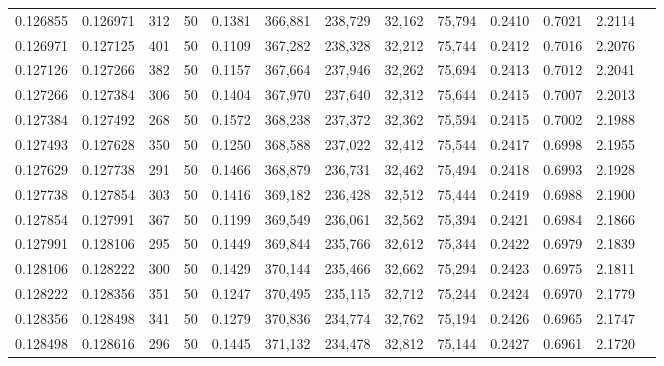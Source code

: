 \begin{tabular}{rrrrrrrrrrrrr}
0.126855 & 0.126971 &   312 &  50 &                                     0.1381 & 366,881 & 238,729 &  32,162 &  75,794 & 0.2410 & 0.7021 & 2.2114 \\
0.126971 & 0.127125 &   401 &  50 &                                     0.1109 & 367,282 & 238,328 &  32,212 &  75,744 & 0.2412 & 0.7016 & 2.2076 \\
0.127126 & 0.127266 &   382 &  50 &                                     0.1157 & 367,664 & 237,946 &  32,262 &  75,694 & 0.2413 & 0.7012 & 2.2041 \\
0.127266 & 0.127384 &   306 &  50 &                                     0.1404 & 367,970 & 237,640 &  32,312 &  75,644 & 0.2415 & 0.7007 & 2.2013 \\
0.127384 & 0.127492 &   268 &  50 &                                     0.1572 & 368,238 & 237,372 &  32,362 &  75,594 & 0.2415 & 0.7002 & 2.1988 \\
0.127493 & 0.127628 &   350 &  50 &                                     0.1250 & 368,588 & 237,022 &  32,412 &  75,544 & 0.2417 & 0.6998 & 2.1955 \\
0.127629 & 0.127738 &   291 &  50 &                                     0.1466 & 368,879 & 236,731 &  32,462 &  75,494 & 0.2418 & 0.6993 & 2.1928 \\
0.127738 & 0.127854 &   303 &  50 &                                     0.1416 & 369,182 & 236,428 &  32,512 &  75,444 & 0.2419 & 0.6988 & 2.1900 \\
0.127854 & 0.127991 &   367 &  50 &                                     0.1199 & 369,549 & 236,061 &  32,562 &  75,394 & 0.2421 & 0.6984 & 2.1866 \\
0.127991 & 0.128106 &   295 &  50 &                                     0.1449 & 369,844 & 235,766 &  32,612 &  75,344 & 0.2422 & 0.6979 & 2.1839 \\
0.128106 & 0.128222 &   300 &  50 &                                     0.1429 & 370,144 & 235,466 &  32,662 &  75,294 & 0.2423 & 0.6975 & 2.1811 \\
0.128222 & 0.128356 &   351 &  50 &                                     0.1247 & 370,495 & 235,115 &  32,712 &  75,244 & 0.2424 & 0.6970 & 2.1779 \\
0.128356 & 0.128498 &   341 &  50 &                                     0.1279 & 370,836 & 234,774 &  32,762 &  75,194 & 0.2426 & 0.6965 & 2.1747 \\
0.128498 & 0.128616 &   296 &  50 &                                     0.1445 & 371,132 & 234,478 &  32,812 &  75,144 & 0.2427 & 0.6961 & 2.1720 \\

\end{tabular}
